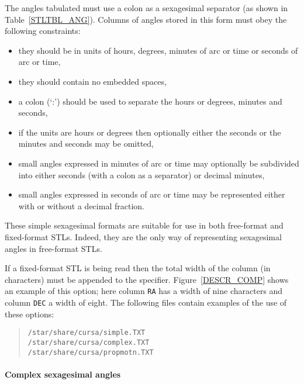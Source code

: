 \documentclass[twoside,11pt]{article}
\renewcommand{\_}{\texttt{\symbol{95}}}
\begin{document}
The angles tabulated must use a colon as a sexagesimal separator (as shown
in Table~\ref{STLTBL_ANG}).  Columns of angles stored in this form must
obey the following constraints:

\begin{itemize}

  \item they should be in units of hours, degrees, minutes of arc or
   time or seconds of arc or time,

  \item they should contain no embedded spaces,

  \item a colon (`:') should be used to separate the hours or degrees,
   minutes and seconds,

  \item if the units are hours or degrees then optionally either the
   seconds or the minutes and seconds may be omitted,

  \item small angles expressed in minutes of arc or time may optionally
   be subdivided into either seconds (with a colon as a separator) or
   decimal minutes,

  \item small angles expressed in seconds of arc or time may be
   represented either with or without a decimal fraction.

\end{itemize}

These simple sexagesimal formats are suitable for use in both
free-format and fixed-format STLs.  Indeed, they are the only way of
representing sexagesimal angles in free-format STLs.

If a fixed-format STL is being read then the total width of the column
(in characters) must be appended to the specifier.
Figure~\ref{DESCR_COMP} shows an example of this option; here column
{\tt RA} has a width of nine characters and column {\tt DEC} a width
of eight.  The following files contain examples of the use of these
options:

\begin{verse}
{\tt /star/share/cursa/simple.TXT}    \\
{\tt /star/share/cursa/complex.TXT}   \\
{\tt /star/share/cursa/propmotn.TXT}
\end{verse}

\paragraph{Complex sexagesimal angles}
\end{document}
